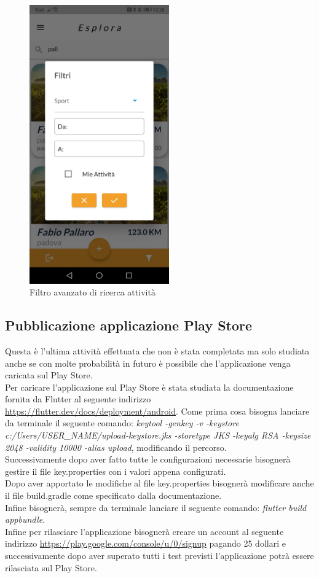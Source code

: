 \begin{figure}[htbp]	
	\centering
	\includegraphics[width=6cm]{immagini/filtroavanzato.jpeg}
	\caption{Filtro avanzato di ricerca attività}
	\label{fig:Filtro avanzato di ricerca attività}
\end{figure}

\newpage

\subsection{Pubblicazione applicazione Play Store}
Questa è l'ultima attività effettuata che non è stata completata ma solo studiata anche se con molte probabilità in futuro è possibile che l'applicazione venga caricata sul Play Store.\\
Per caricare l'applicazione sul Play Store è stata studiata la documentazione fornita da Flutter al seguente indirizzo \url{https://flutter.dev/docs/deployment/android}.
Come prima cosa bisogna lanciare da terminale il seguente comando: \textit{keytool -genkey -v -keystore c:/Users/USER\_NAME/upload-keystore.jks -storetype JKS -keyalg RSA -keysize 2048 -validity 10000 -alias upload}, modificando il percorso.\\
Successivamente dopo aver fatto tutte le configurazioni necessarie bisognerà gestire il file key.properties con i valori appena configurati.\\
Dopo aver apportato le modifiche al file key.properties bisognerà modificare anche il file build.gradle come specificato dalla documentazione.\\
Infine bisognerà, sempre da terminale lanciare il seguente comando: \textit{flutter build appbundle}.\\
Infine per rilasciare l'applicazione bisognerà creare un account al seguente indirizzo \url{https://play.google.com/console/u/0/signup} pagando 25 dollari e successivamente dopo aver superato tutti i test previsti l'applicazione potrà essere rilasciata sul Play Store.\\

